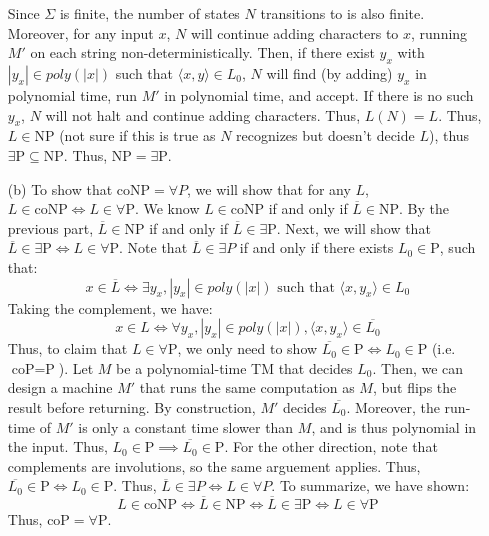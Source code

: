 \documentclass[12pt]{article}
\begin{document}
\begin{solution}
\begin{enumerate}
\begin{enumerate}
        \end{enumerate}
        Since $\Sigma$ is finite, the number of states $N$ transitions to is also finite. Moreover, for any input $x$, $N$ will continue adding characters to $x$, running $M'$ on each string non-deterministically. Then, if there exist $y_x$ with $|y_x| \in poly(|x|)$ such that $\langle x, y \rangle \in L_0$, $N$ will find (by adding) $y_x$ in polynomial time, run $M'$ in polynomial time, and accept. If there is no such $y_x$, $N$ will not halt and continue adding characters. Thus, $L(N) = L$. \bbni
        Thus, $L \in \text{NP}$ (not sure if this is true as $N$ recognizes but doesn't decide $L$), thus $\exists \text{P} \subseteq \text{NP}$. Thus, $\text{NP} = \exists \text{P}$. 
        
        \item[(b)] To show that $\text{coNP} = \forall P$, we will show that for any $L$, $L \in \text{coNP} \iff L \in \forall \text{P}$. \bbni
        We know $L \in \text{coNP}$ if and only if $\overline{L} \in \text{NP}$. \bbni        
        By the previous part, $\overline{L} \in \text{NP}$ if and only if $\overline{L} \in \exists \text{P}$. \bbni
        Next, we will show that $\overline{L} \in \exists \text{P} \iff L \in \forall \text{P}$. Note that $\overline{L} \in \exists P$ if and only if there exists $L_0 \in \text{P}$, such that: 
        \[  x \in \overline{L} \iff \exists y_x, |y_x| \in poly(|x|) \text{ such that } \langle x, y_x\rangle \in L_0 \]
        Taking the complement, we have: 
        \[ x \in L \iff \forall y_x, |y_x| \in poly(|x|), \langle x, y_x \rangle \in \overline{L_0} \]  
        Thus, to claim that $L \in \forall \text{P}$, we only need to show $\overline{L_0} \in \text{P} \iff L_0 \in \text{P}$ (i.e. $\text{coP} = \text{P}$). Let $M$ be a polynomial-time TM that decides $L_0$. Then, we can design a machine $M'$ that runs the same computation as $M$, but flips the result before returning. By construction, $M'$ decides $\overline{L_0}$. Moreover, the run-time of $M'$ is only a constant time slower than $M$, and is thus polynomial in the input. Thus, $L_0 \in \text{P} \implies \overline{L_0} \in \text{P}$. For the other direction, note that complements are involutions, so the same arguement applies. Thus, $\overline{L_0} \in \text{P} \iff L_0 \in \text{P}$. \bbni 
        Thus, $\overline{L} \in \exists P \iff L \in  \forall P$. \bbni
        To summarize, we have shown: 
        \[ L \in \text{coNP} \iff \overline{L} \in \text{NP} \iff \overline{L} \in \exists \text{P} \iff L \in \forall \text{P}\]
        Thus, $\text{coP} = \forall \text{P}$. 
    \end{enumerate}
\end{solution}
\end{document}
